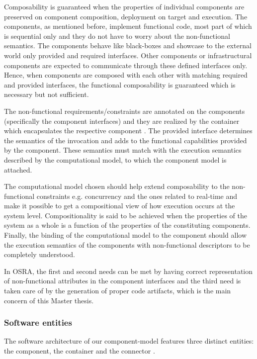 \begin{description}
Composability is guaranteed when the properties of individual components are preserved on component composition, deployment on target and execution. The components, as mentioned before, implement functional code, most part of which is sequential only and they do not have to worry about the non-functional semantics. The components behave like black-boxes and showcase to the external world only provided and required interfaces. Other components or infrastructural components are expected to communicate through these defined interfaces only. Hence, when components are composed with each other with matching required and provided interfaces, the functional composability is guaranteed which is necessary but not sufficient.

The non-functional requirements/constraints are annotated on the components (specifically the component interfaces) and they are realized by the container which encapsulates the respective component \cite{SAVOIR}\cite{ComponentModel}. The provided interface determines the semantics of the invocation and adds to the functional capabilities provided by the component. These semantics must match with the execution semantics described by the computational model, to which the component model is attached.

The computational model chosen should help extend composability to the non-functional constraints e.g. concurrency and the ones related to real-time and make it possible to get a compositional view of how execution occurs at the system level. Compositionality is said to be achieved when the properties of the system as a whole is a function of the properties of the constituting components. Finally, the binding of the computational model to the component should allow the execution semantics of the components with non-functional descriptors to be completely understood.

In OSRA, the first and second needs can be met by having correct representation of non-functional attributes in the component interfaces and the third need is taken care of by the generation of proper code artifacts, which is the main concern of this Master thesis.     
\end{description}

\subsubsection{Software entities}
\label {section: Software entities}
The software architecture of our component-model features three distinct entities: the component, the container and the connector \cite{CompBasedProcess}\cite{SAVOIR}\cite{SoftRefArch}.

